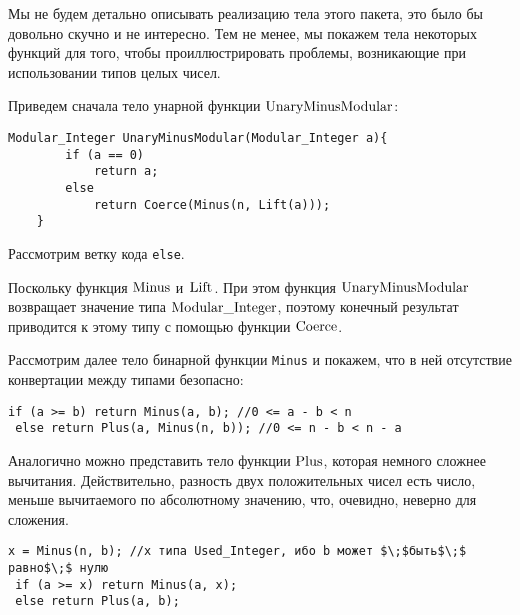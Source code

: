    Мы не будем детально описывать реализацию тела этого пакета, это было бы довольно скучно и не интересно. Тем не менее, мы покажем
    тела некоторых функций для того, чтобы проиллюстрировать проблемы, возникающие при использовании типов целых чисел.

    Приведем сначала тело унарной функции $\lstinline{UnaryMinusModular}$:
    \begin{lstlisting}[mathescape=true, frame=none]
    Modular_Integer UnaryMinusModular(Modular_Integer a){
    	if (a == 0)
    		return a;
    	else
    		return Coerce(Minus(n, Lift(a)));
    }
    \end{lstlisting}

    Рассмотрим ветку кода \lstinline{else}.

    Поскольку функция $\lstinline{Minus}$ и $\lstinline{Lift}$. При этом функция
    $\lstinline{UnaryMinusModular}$ возвращает значение типа $\lstinline{Modular_Integer}$, поэтому конечный результат приводится к этому типу с помощью функции $\lstinline{Coerce}$.

    Рассмотрим далее тело бинарной функции \lstinline{Minus} и покажем, что в ней отсутствие конвертации между типами безопасно:
    \begin{leftbar}
    \begin{lstlisting}[mathescape=true, frame=none]
 if (a >= b) return Minus(a, b); //0 <= a - b < n
 else return Plus(a, Minus(n, b)); //0 <= n - b < n - a
    \end{lstlisting}
    \end{leftbar}

    Аналогично можно представить тело функции $\lstinline{Plus}$, которая немного сложнее вычитания. Действительно, разность двух положительных чисел есть число, меньше вычитаемого по абсолютному значению, что, очевидно, неверно для сложения.
    \begin{leftbar}
    \begin{lstlisting}[mathescape=true, frame=none]
 x = Minus(n, b); //x типа Used_Integer, ибо b может $\;$быть$\;$ равно$\;$ нулю
 if (a >= x) return Minus(a, x);
 else return Plus(a, b);
    \end{lstlisting}
    \end{leftbar}

